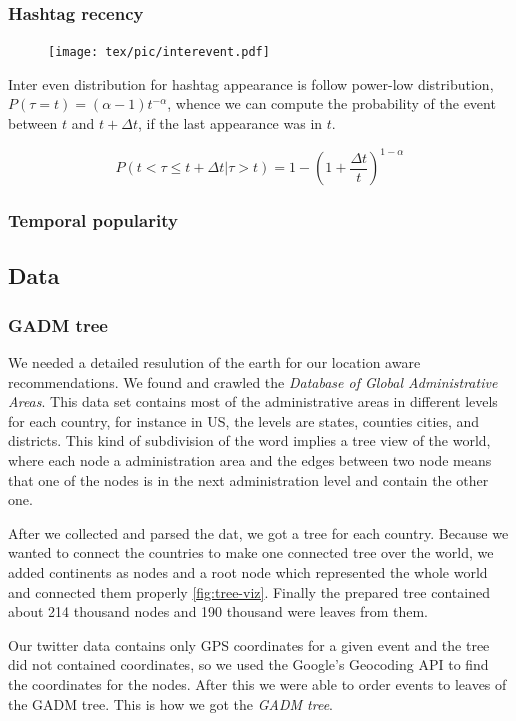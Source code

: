 \subsubsection{Hashtag recency}
\begin{figure}[''placement specifier''] \label{fig:online}
\centering 
\texttt{[image: tex/pic/interevent.pdf]}
\end{figure}
Inter even distribution for hashtag appearance is follow power-low distribution, 
$P\left(\tau=t\right)=\left(\alpha-1\right)t^{-\alpha}$, whence we can compute the probability of 
the event between $t$ and $t+\Delta t$, if the last appearance  was in $t$.

\[P\left(t<\tau\leq t + \Delta t | \tau> t\right) = 1-\left(1 + \frac{\Delta t}{t}\right)^{1-\alpha}\]

\subsubsection{Temporal popularity}
\subsection{Data}
\subsubsection{GADM tree}
We needed a detailed resulution of the earth for our location aware recommendations. We found and crawled 
 the \emph{Database of Global Administrative Areas}\cite{gadm}. This data set contains most of 
 the administrative areas in different levels for each country, for instance in US, the levels are states, counties cities, and districts. This kind of subdivision of the word implies a tree view of the world, where each node a administration area and the edges between two node means that one of the nodes is in the next  administration level and contain the other one. 
 
 After we collected and parsed the dat, we got a tree for each country. Because we wanted to connect 
 the countries to make one connected tree over the world, we added continents as nodes and a root node which represented the whole world and connected them properly \ref{fig:tree-viz}. Finally the prepared tree contained about 214 thousand  nodes and 190 thousand were leaves from them. 
 
 Our twitter data  contains only GPS coordinates for a given event and the tree did not contained coordinates, so we
 used the Google's Geocoding API \cite{geocoding} to find the coordinates for the nodes. After this we were able to order events to leaves of the GADM tree. This is how we got the \emph{GADM tree}.
 
